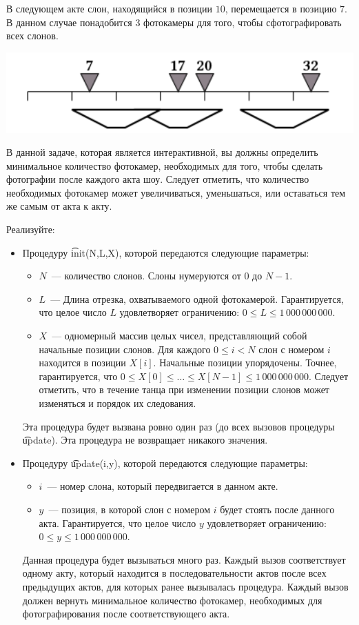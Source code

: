 В следующем акте слон, находящийся в позиции $10$, перемещается в позицию $7$. В данном случае понадобится 3 фотокамеры для того, чтобы сфотографировать всех слонов.

\includegraphics{elephants1.png}

В данной задаче, которая является интерактивной, вы должны определить минимальное количество фотокамер, необходимых для того, чтобы сделать фотографии после каждого акта шоу. Следует отметить, что количество необходимых фотокамер может увеличиваться, уменьшаться, или оставаться тем же самым от акта к акту.


Реализуйте:
\begin{itemize}

\item Процедуру \t{init(N,L,X)}, которой передаются следующие параметры:
\begin{itemize}
\item $N$~--- количество слонов. Слоны нумеруются от $0$ до $N-1$.

\item $L$~--- Длина отрезка, охватываемого одной фотокамерой. Гарантируется, что целое число $L$ удовлетворяет ограничению: $0 \le L \le 1\,000\,000\,000$.

\item $X$~--- одномерный массив целых чисел, представляющий собой начальные позиции слонов. Для каждого $0 \le i < N$ слон с номером $i$ находится в позиции $X[i]$. Начальные позиции упорядочены. Точнее, гарантируется, что $0 \le X[0] \le \dots \le X[N-1] \le 1\,000\,000\,000$. Следует отметить, что в течение танца при изменении позиции слонов может изменяться и порядок их следования.

\end{itemize}

Эта процедура будет вызвана ровно один раз (до всех вызовов процедуры \t{update}). Эта процедура не возвращает никакого значения.
\item Процедуру \t{update(i,y)}, которой передаются следующие параметры:
\begin{itemize}
\item $i$~--- номер слона, который передвигается в данном акте.
\item $y$~--- позиция, в которой слон с номером $i$ будет стоять после данного акта. Гарантируется, что целое число $y$ удовлетворяет ограничению: $0 \le y \le 1\,000\,000\,000$.
\end{itemize}
Данная процедура будет вызываться много раз. Каждый вызов соответствует одному акту, который находится в последовательности актов после всех предыдущих актов, для которых ранее вызывалась процедура. Каждый вызов должен вернуть минимальное количество фотокамер, необходимых для фотографирования после соответствующего акта.
\end{itemize}



